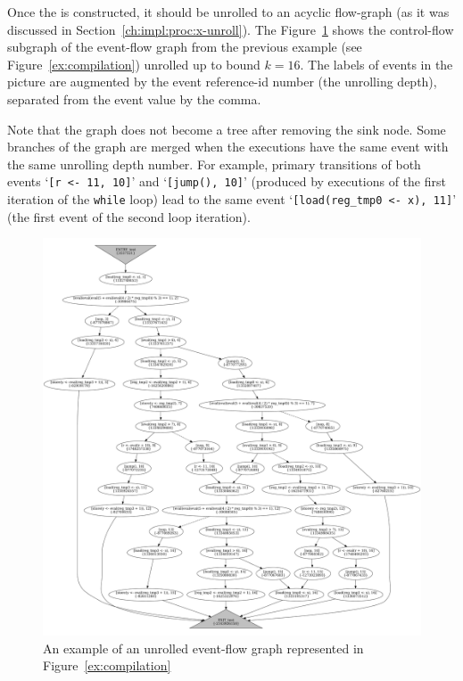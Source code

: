 Once the \xgraph[CF] is constructed, it should be unrolled to an acyclic flow-graph (as it was discussed in Section~\ref{ch:impl:proc:x-unroll}).
The Figure~\ref{ex:unrolling} shows the control-flow subgraph  of the event-flow graph from the previous example (see Figure~\ref{ex:compilation}) unrolled up to bound $k=16$.
The labels of events in the picture are augmented by the event reference-id number (the unrolling depth), separated from the event value by the comma.

Note that the graph does not become a tree after removing the sink node.
Some branches of the graph are merged when the executions have the same event with the same unrolling depth number.
For example, primary transitions of both events `\lstinline{[r <- 11, 10]}' and `\lstinline{[jump(), 10]}' (produced by executions of the first iteration of the \texttt{while} loop) lead to the same event `\lstinline{[load(reg_tmp0 <- x), 11]}' (the first event of the second loop iteration).


\begin{figure}[!h]
\includegraphics[width=\textwidth,keepaspectratio]{img/my/graphs/test_unrolled.png}
\caption{An example of an unrolled event-flow graph represented in Figure~\ref{ex:compilation}}
\label{ex:unrolling}
\end{figure}


